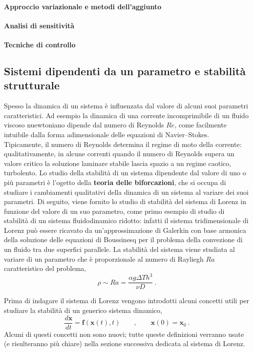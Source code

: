 {\color{red} \paragraph{Approccio variazionale e metodi dell'aggiunto} }
{\color{red} \paragraph{Analisi di sensitività} }
{\color{red} \paragraph{Tecniche di controllo} }

\subsection{Sistemi dipendenti da un parametro e stabilità strutturale}
Spesso la dinamica di un sistema è influenzata dal valore di alcuni suoi parametri caratteristici. Ad esempio la dinamica di una corrente incomprimibile di un fluido viscoso nuewtoniano dipende dal numero di Reynolds $Re$, come facilmente intuibile dalla forma adimensionale delle equazioni di Navier--Stokes. Tipicamente, il numero di Reynolds determina il regime di moto della corrente: qualitativamente, in alcune correnti quando il numero di Reynolds supera un valore critico la soluzione laminare stabile lascia spazio a un regime caotico, turbolento.
\newline
Lo studio della stabilità di un sistema dipendente dal valore di uno o più parametri è l'ogetto della \textbf{teoria delle biforcazioni}, che si occupa di studiare i cambiamenti qualitativi della dinamica di un sistema al variare dei suoi parametri. Di seguito, viene fornito lo studio di stabilità del sistema di Lorenz in funzione del valore di un suo parametro, come primo esempio di studio di stabilità di un sistema fluidodinamico ridotto: infatti il sistema tridimensionale di Lorenz può essere ricavato da un'approssimazione di Galerkin con base armonica della soluzione delle equazioni di Boussinesq per il problema della convezione di un fluido tra due superfici parallele. La stabilità del sistema viene studiata al variare di un parametro che è proporzionale al numero di Rayliegh $Ra$ caratteristico del problema,
\begin{equation}
 \rho \sim Ra = \dfrac{\alpha g \Delta T h^3}{\nu D} \ .
\end{equation}


\vspace{0.2cm}
\noindent
Prima di indagare il sistema di Lorenz vengono introdotti alcuni concetti utili per 
 studiare la stabilità di un generico sistema dinamico,
\begin{equation}
 \dfrac{d \bm{x}}{d t } = \bm{f}(\bm{x}(t),t) \qquad , \qquad \bm{x}(0) = \bm{x}_0 \ .
\end{equation}
Alcuni di questi concetti non sono nuovi; tutte queste definizioni verranno usate 
 (e risulteranno più chiare) nella sezione successiva dedicata al sistema di Lorenz.

